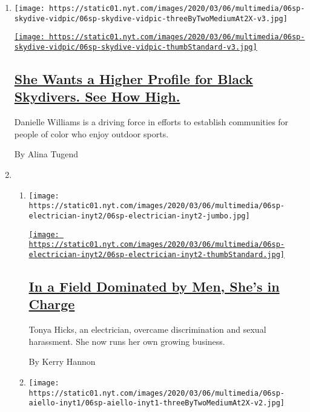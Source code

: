 \begin{enumerate}
\def\labelenumi{\arabic{enumi}.}
\item
  \texttt{[image: https://static01.nyt.com/images/2020/03/06/multimedia/06sp-skydive-vidpic/06sp-skydive-vidpic-threeByTwoMediumAt2X-v3.jpg]}

  \href{/2020/03/05/sports/sky-diving-african-americans.html}{\texttt{[image: https://static01.nyt.com/images/2020/03/06/multimedia/06sp-skydive-vidpic/06sp-skydive-vidpic-thumbStandard-v3.jpg]}}

  \hypertarget{she-wants-a-higher-profile-for-black-skydivers-see-how-high}{%
  \subsection{\texorpdfstring{\href{/2020/03/05/sports/sky-diving-african-americans.html}{She
  Wants a Higher Profile for Black Skydivers. See How
  High.}}{She Wants a Higher Profile for Black Skydivers. See How High.}}\label{she-wants-a-higher-profile-for-black-skydivers-see-how-high}}

  Danielle Williams is a driving force in efforts to establish
  communities for people of color who enjoy outdoor sports.

  By Alina Tugend
\item
  \begin{enumerate}
  \def\labelenumii{\arabic{enumii}.}
  \item
    \texttt{[image: https://static01.nyt.com/images/2020/03/06/multimedia/06sp-electrician-inyt2/06sp-electrician-inyt2-jumbo.jpg]}

    \href{/2020/03/05/business/women-electricians.html}{\texttt{[image: https://static01.nyt.com/images/2020/03/06/multimedia/06sp-electrician-inyt2/06sp-electrician-inyt2-thumbStandard.jpg]}}

    \hypertarget{in-a-field-dominated-by-men-shes-in-charge}{%
    \subsection{\texorpdfstring{\href{/2020/03/05/business/women-electricians.html}{In
    a Field Dominated by Men, She's in
    Charge}}{In a Field Dominated by Men, She's in Charge}}\label{in-a-field-dominated-by-men-shes-in-charge}}

    Tonya Hicks, an electrician, overcame discrimination and sexual
    harassment. She now runs her own growing business.

    By Kerry Hannon
  \item
    \texttt{[image: https://static01.nyt.com/images/2020/03/06/multimedia/06sp-aiello-inyt1/06sp-aiello-inyt1-threeByTwoMediumAt2X-v2.jpg]}


\end{enumerate}
\end{enumerate}
